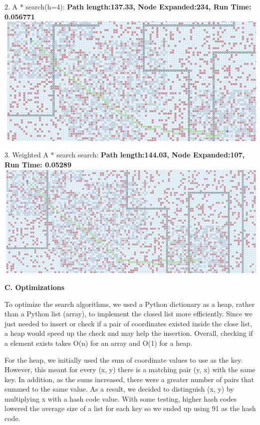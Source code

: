 \documentclass[12pt, letterpaper]{article}
\begin{document}
2. A * search(h=4): \newline
\medskip
\textbf{Path length:137.33, Node Expanded:234,	Run Time: 0.056771}\newline
\noindent \includegraphics[scale=0.2]{"b-map5-1-a"}\newline

3. Weighted A * search search:\newline
\medskip
\textbf{Path length:144.03, Node Expanded:107,	Run Time: 0.05289}\newline
\noindent \includegraphics[scale=0.2]{"b-map5-1-w-2"}\newline


\pagebreak %

\noindent \textbf{C. Optimizations}

To optimize the search algorithms, we used a Python dictionary as a heap, rather than a Python list (array), to implement the closed list more efficiently. Since we just needed to insert or check if a pair of coordinates existed inside the close list, a heap would speed up the check and may help the insertion. Overall, checking if a element exists takes O(n) for an array and O(1) for a heap.

For the heap, we initially used the sum of coordinate values to use as the key. However, this meant for every (x, y) there is a matching pair (y, x) with the same key. In addition, as the sums increased, there were a greater number of pairs that summed to the same value. As a result, we decided to distinguish (x, y) by multiplying x with a hash code value. With some testing, higher hash codes lowered the average size of a list for each key so we ended up using 91 as the hash code. 
\end{document}
